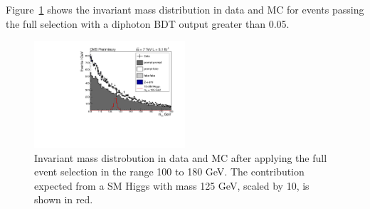 Figure~\ref{fig:massmcdata} shows the invariant mass distribution in data and MC for events passing the full
selection with a diphoton BDT output greater than 0.05.

\begin{figure}[hbt!]
\begin{center}
  \includegraphics[width=0.5\textwidth]{hgg7TeV/variablePlots/mass}
 \caption{Invariant mass distrobution in data and MC after applying the full event selection in the
 range 100 to 180 GeV. The contribution expected from a SM Higgs with mass 125 GeV, scaled by 10, 
 is shown in red. }
 \label{fig:massmcdata}
\end{center}
\end{figure}


